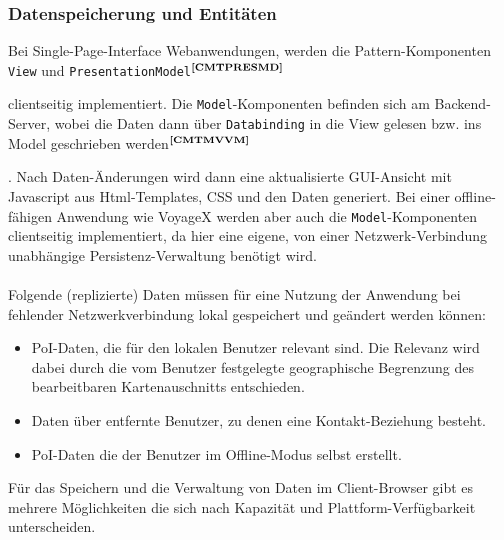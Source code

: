 \subsubsection{Datenspeicherung und Entitäten}\label{5_DSE}
Bei Single-Page-Interface Webanwendungen, werden die Pattern-Komponenten \texttt{View} und \texttt{PresentationModel}$^{\textbf{\ref{CMTPRESMD}}}$%
\addtocounter{footnote}{1}%
 clientseitig implementiert. Die \texttt{Model}-Komponenten befinden sich am Backend-Server, wobei die Daten dann über \texttt{Databinding} in die View gelesen bzw. ins Model geschrieben werden$^{\textbf{\ref{CMTMVVM}}}$%
\addtocounter{footnote}{1}%
. Nach Daten-Änderungen wird dann eine aktualisierte GUI-Ansicht mit Javascript aus Html-Templates, CSS und den Daten generiert. Bei einer offline-fähigen Anwendung wie VoyageX werden aber auch die \texttt{Model}-Komponenten clientseitig implementiert, da hier eine eigene, von einer Netzwerk-Verbindung unabhängige Persistenz-Verwaltung benötigt wird.\\ \\
Folgende (replizierte) Daten müssen für eine Nutzung der Anwendung bei fehlender Netzwerkverbindung lokal gespeichert und geändert werden können:
\begin{itemize}[leftmargin=*,noitemsep,topsep=1ex,parsep=0pt,partopsep=0pt]
\item PoI-Daten, die für den lokalen Benutzer relevant sind. Die Relevanz wird dabei durch die vom Benutzer festgelegte geographische Begrenzung des bearbeitbaren Kartenauschnitts entschieden. 
\item Daten über entfernte Benutzer, zu denen eine Kontakt-Beziehung besteht.
\item PoI-Daten die der Benutzer im Offline-Modus selbst erstellt.
\end{itemize}
Für das Speichern und die Verwaltung von Daten im Client-Browser gibt es mehrere Möglichkeiten die sich nach Kapazität und Plattform-Verfügbarkeit unterscheiden.

\enlargethispage{3\baselineskip} %
